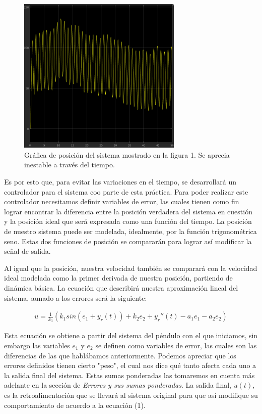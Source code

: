 \documentclass[12pt, letterpaper]{article}
\begin{document}
\begin{figure}[H]
	\centering
	\includegraphics[width=0.7\textwidth]{pospendulum.png}
	\caption{Gráfica de posición del sistema mostrado en la figura 1. Se aprecia inestable a través del tiempo.}
\end{figure}

Es por esto que, para evitar las variaciones en el tiempo, se desarrollará un controlador para el sistema coo parte de esta práctica. Para poder realizar este controlador necesitamos definir variables de error, las cuales tienen como fin lograr encontrar la diferencia entre la posición verdadera del sistema en cuestión y la posición ideal que será expresada como una función del tiempo. La posición de nuestro sistema puede ser modelada, idealmente, por la función trigonométrica seno. Estas dos funciones de posición se compararán para lograr así modificar la señal de salida.

Al igual que la posición, nuestra velocidad también se comparará con la velocidad ideal modelada como la primer derivada de nuestra posición, partiendo de dinámica básica. La ecuación que describirá nuestra aproximación lineal del sistema, aunado a los errores será la siguiente:

\begin{align}
	u = \frac{1}{k_3} (k_1 sin(e_1 + y_r(t)) + k_2 e_2 + y_r''(t) - a_1 e_1 - a_2 e_2)
\end{align}

Esta ecuación se obtiene a partir del sistema del péndulo con el que iniciamos, sin embargo las variables $e_1$ y $e_2$ se definen como variables de error, las cuales son las diferencias de las que hablábamos anteriormente. Podemos apreciar que los errores definidos tienen cierto "peso", el cual nos dice qué tanto afecta cada uno a la salida final del sistema. Estas sumas ponderadas las tomaremos en cuenta más adelante en la sección de \textit{Errores y sus sumas ponderadas}. La salida final, $u(t)$, es la retroalimentación que se llevará al sistema original para que así modifique su comportamiento de acuerdo a la ecuación (1).
\end{document}
